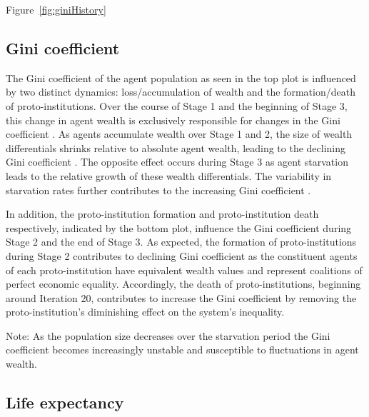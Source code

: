 ﻿Figure~\ref{fig:giniHistory}

\subsection{Gini coefficient}

    The Gini coefficient  of the agent population as seen in the top plot is influenced by two distinct dynamics: loss/accumulation of wealth and the formation/death of proto-institutions. Over the course of Stage 1 and the beginning of Stage 3, this change in agent wealth is exclusively responsible for changes in the Gini coefficient . As agents accumulate wealth over Stage 1 and 2, the size of wealth differentials shrinks relative to absolute agent wealth, leading to the declining Gini coefficient . The opposite effect occurs during Stage 3 as agent starvation leads to the relative growth of these wealth differentials. The variability in starvation rates further contributes to the increasing Gini coefficient .

    In addition, the proto-institution formation and proto-institution death respectively, indicated by the bottom plot, influence the Gini coefficient  during Stage 2 and the end of Stage 3. As expected, the formation of proto-institutions during Stage 2 contributes to declining Gini coefficient  as the constituent agents of each proto-institution have equivalent wealth values and represent coalitions of perfect economic equality. Accordingly, the death of proto-institutions, beginning around Iteration 20, contributes to increase the Gini coefficient by removing the proto-institution’s diminishing effect on the system’s inequality. 

Note: As the population size decreases over the starvation period the Gini coefficient  becomes increasingly unstable and susceptible to fluctuations in agent wealth.
\subsection{Life expectancy}




